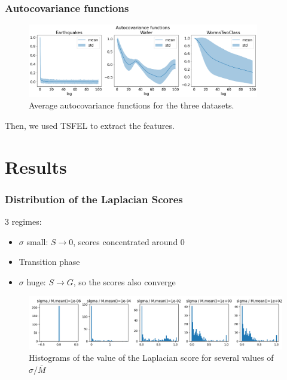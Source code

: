 \documentclass{beamer}
\begin{document}
\begin{frame}
\frametitle{Autocovariance functions}

\begin{figure}
    \centering
    \includegraphics[width=0.9\textwidth, keepaspectratio=True]{figures/ds_acov.png}
    \caption{Average autocovariance functions for the three datasets.}
    \label{fig:ds_acov}
\end{figure}

\medskip
Then, we used TSFEL \cite{barandas_tsfel_2020} to extract the features.

\end{frame}

\section{Results}
\begin{frame}
\frametitle{Distribution of the Laplacian Scores}

3 regimes:
\begin{itemize}
    \item $\sigma$ small: $S \rightarrow 0$, scores concentrated around $0$
    \item Transition phase
    \item $\sigma$ huge: $S \rightarrow G$, so the scores also converge
\end{itemize}
\medskip
\begin{figure}
    \centering
    \includegraphics[width=\textwidth, keepaspectratio=True]{figures/laplacian_histograms.png}
    \caption{Histograms of the value of the Laplacian score for several values of $\sigma / \overline{M}$}
    \label{fig:sigma_histograms}
\end{figure}

\end{frame}
\end{document}
